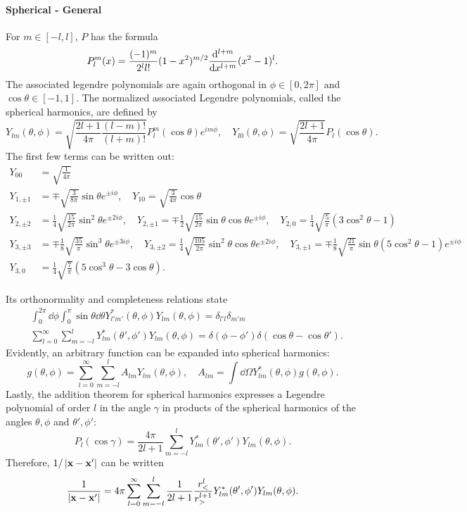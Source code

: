 \documentclass{article}
\begin{document}
\paragraph{Spherical - General}
For $m\in[-l,l]$, $P$ has the formula
$$P^m_l(x)=\frac{(-1)^m}{2^ll!}(1-x^2)^{m/2}\frac{\mathrm{d}^{l+m}}{\mathrm{d}{x}^{l+m}}(x^2-1)^l.$$
The associated legendre polynomials are again orthogonal in $\phi\in[0,2\pi]$ and $\cos\theta\in[-1,1]$. The normalized associated Legendre polynomials, called the spherical harmonics, are defined by 
$$Y_{lm}(\theta,\phi)=\sqrt{\frac{2l+1}{4\pi}\frac{(l-m)!}{(l+m)!}}P^m_l(\cos\theta)e^{im\phi},\quad Y_{l0}(\theta,\phi)=\sqrt{\frac{2l+1}{4\pi}}P_l(\cos\theta).$$
The first few terms can be written out:
\begin{align*}
    Y_{00}&=\sqrt{\frac 1{4\pi}}\\
    Y_{1,\pm 1}&=\mp\sqrt{\frac 3{8\pi}}\sin\theta e^{\pm i\phi},\quad Y_{10}=\sqrt{\frac 3{4\pi}}\cos\theta\\
    Y_{2,\pm 2}&=\frac 14\sqrt{\frac{15}{2\pi}}\sin^2\theta e^{\pm 2i\phi},\quad Y_{2,\pm 1}=\mp\frac 12\sqrt{\frac{15}{2\pi}}\sin\theta\cos\theta e^{\pm i\phi},\quad Y_{2,0}=\frac 14\sqrt{\frac 5\pi}(3\cos^2\theta-1)\\
    Y_{3,\pm 3}&=\mp\frac 18\sqrt{\frac{35}\pi}\sin^3\theta e^{\pm 3i\phi},\quad Y_{3,\pm 2}=\frac 14\sqrt{\frac{105}{2\pi}}\sin^2\theta\cos\theta e^{\pm 2i\phi},\quad Y_{3,\pm 1}=\mp\frac 18\sqrt{\frac{21}\pi}\sin\theta(5\cos^2\theta-1)e^{\pm i\phi}\\
    Y_{3,0}&=\frac 14\sqrt{\frac 7\pi}(5\cos^3\theta-3\cos\theta).
\end{align*}

Its orthonormality and completeness relations state 
\begin{align*}
    &\int^{2\pi}_0\dd\phi\int^\pi_0\sin\theta\dd\theta Y^*_{l'm'}(\theta,\phi)Y_{lm}(\theta,\phi)=\delta_{l'l}\delta_{m'm}\\
    &\sum^\infty_{l=0}\sum^l_{m=-l}Y^*_{lm}(\theta',\phi')Y_{lm}(\theta,\phi)=\delta(\phi-\phi')\delta(\cos\theta-\cos\theta').
\end{align*}
Evidently, an arbitrary function can be expanded into spherical harmonics:
$$g(\theta,\phi)=\sum^\infty_{l=0}\sum^l_{m=-l}A_{lm}Y_{lm}(\theta,\phi),\quad A_{lm}=\int\dd\Omega Y^*_{lm}(\theta,\phi)g(\theta,\phi).$$
Lastly, the addition theorem for spherical harmonics expresses a Legendre polynomial of order $l$ in the angle $\gamma$ in products of the spherical harmonics of the angles $\theta,\phi$ and $\theta',\phi'$:
$$P_l(\cos\gamma)=\frac{4\pi}{2l+1}\sum^l_{m=-l}Y^*_{lm}(\theta',\phi')Y_{lm}(\theta,\phi).$$
Therefore, $1/\left\lvert\mathbf x-\mathbf x'\right\rvert$ can be written
$$\frac 1{\left\lvert\mathbf x-\mathbf x'\right\rvert}=4\pi\sum^\infty_{l=0}\sum^l_{m=-l}\frac 1{2l+1}\frac{r^l_{<}}{r^{l+1}_>}Y^*_{lm}(\theta',\phi')Y_{lm}(\theta,\phi).$$
\end{document}
